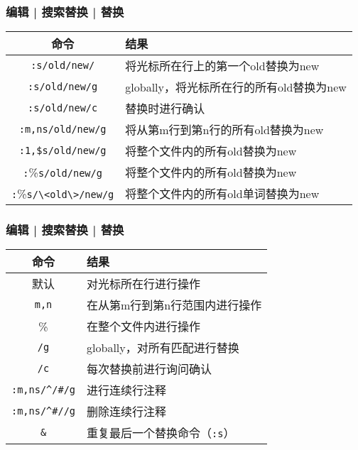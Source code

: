 \begin{frame}[fragile]
  \frametitle{编辑 | 搜索替换 | \alert{替换}}
  \begin{table}
    \centering
    \begin{tabularx}{\textwidth}{cX}
      \hline
      \rowcolor{blue!50}命令 & 结果\\
      \hline
      \verb|:s/old/new/| & 将光标所在行上的第一个old替换为new\\
      \verb|:s/old/new/g| & globally，将光标所在行的所有old替换为new\\
      \verb|:s/old/new/c| & 替换时进行确认\\
      \verb|:m,ns/old/new/g| & 将从第m行到第n行的所有old替换为new\\
      \verb|:1,$s/old/new/g| & 将整个文件内的所有old替换为new\\
      \verb|:|\%\verb|s/old/new/g| & 将整个文件内的所有old替换为new\\
      \verb|:|\%\verb|s/\<old\>/new/g| & 将整个文件内的所有old单词替换为new\\
      \hline
    \end{tabularx}
  \end{table}
\end{frame}

\begin{frame}[fragile]
  \frametitle{编辑 | 搜索替换 | \alert{替换}}
  \begin{table}
    \centering
    \begin{tabularx}{0.9\textwidth}{cX}
      \hline
      \rowcolor{blue!50}命令 & 结果\\
      \hline
      默认 & 对光标所在行进行操作\\
      \verb|m,n| & 在从第m行到第n行范围内进行操作\\
      \% & 在整个文件内进行操作\\
      \verb|/g| & globally，对所有匹配进行替换\\
      \verb|/c| & 每次替换前进行询问确认\\
      \hline
      \verb|:m,ns/^/#/g| & 进行连续行注释\\
      \verb|:m,ns/^#//g| & 删除连续行注释\\
      \hline
      \verb|&| & 重复最后一个替换命令（\verb|:s|）\\
      \hline
    \end{tabularx}
  \end{table}
\end{frame}

